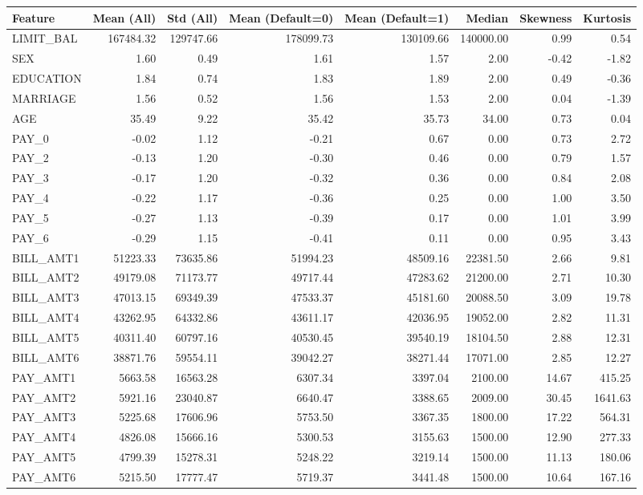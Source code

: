 \begin{tabular}{lrrrrrrr}
\toprule
Feature & Mean (All) & Std (All) & Mean (Default=0) & Mean (Default=1) & Median & Skewness & Kurtosis \\
\midrule
LIMIT\_BAL & 167484.32 & 129747.66 & 178099.73 & 130109.66 & 140000.00 & 0.99 & 0.54 \\
SEX & 1.60 & 0.49 & 1.61 & 1.57 & 2.00 & -0.42 & -1.82 \\
EDUCATION & 1.84 & 0.74 & 1.83 & 1.89 & 2.00 & 0.49 & -0.36 \\
MARRIAGE & 1.56 & 0.52 & 1.56 & 1.53 & 2.00 & 0.04 & -1.39 \\
AGE & 35.49 & 9.22 & 35.42 & 35.73 & 34.00 & 0.73 & 0.04 \\
PAY\_0 & -0.02 & 1.12 & -0.21 & 0.67 & 0.00 & 0.73 & 2.72 \\
PAY\_2 & -0.13 & 1.20 & -0.30 & 0.46 & 0.00 & 0.79 & 1.57 \\
PAY\_3 & -0.17 & 1.20 & -0.32 & 0.36 & 0.00 & 0.84 & 2.08 \\
PAY\_4 & -0.22 & 1.17 & -0.36 & 0.25 & 0.00 & 1.00 & 3.50 \\
PAY\_5 & -0.27 & 1.13 & -0.39 & 0.17 & 0.00 & 1.01 & 3.99 \\
PAY\_6 & -0.29 & 1.15 & -0.41 & 0.11 & 0.00 & 0.95 & 3.43 \\
BILL\_AMT1 & 51223.33 & 73635.86 & 51994.23 & 48509.16 & 22381.50 & 2.66 & 9.81 \\
BILL\_AMT2 & 49179.08 & 71173.77 & 49717.44 & 47283.62 & 21200.00 & 2.71 & 10.30 \\
BILL\_AMT3 & 47013.15 & 69349.39 & 47533.37 & 45181.60 & 20088.50 & 3.09 & 19.78 \\
BILL\_AMT4 & 43262.95 & 64332.86 & 43611.17 & 42036.95 & 19052.00 & 2.82 & 11.31 \\
BILL\_AMT5 & 40311.40 & 60797.16 & 40530.45 & 39540.19 & 18104.50 & 2.88 & 12.31 \\
BILL\_AMT6 & 38871.76 & 59554.11 & 39042.27 & 38271.44 & 17071.00 & 2.85 & 12.27 \\
PAY\_AMT1 & 5663.58 & 16563.28 & 6307.34 & 3397.04 & 2100.00 & 14.67 & 415.25 \\
PAY\_AMT2 & 5921.16 & 23040.87 & 6640.47 & 3388.65 & 2009.00 & 30.45 & 1641.63 \\
PAY\_AMT3 & 5225.68 & 17606.96 & 5753.50 & 3367.35 & 1800.00 & 17.22 & 564.31 \\
PAY\_AMT4 & 4826.08 & 15666.16 & 5300.53 & 3155.63 & 1500.00 & 12.90 & 277.33 \\
PAY\_AMT5 & 4799.39 & 15278.31 & 5248.22 & 3219.14 & 1500.00 & 11.13 & 180.06 \\
PAY\_AMT6 & 5215.50 & 17777.47 & 5719.37 & 3441.48 & 1500.00 & 10.64 & 167.16 \\
\bottomrule
\end{tabular}
